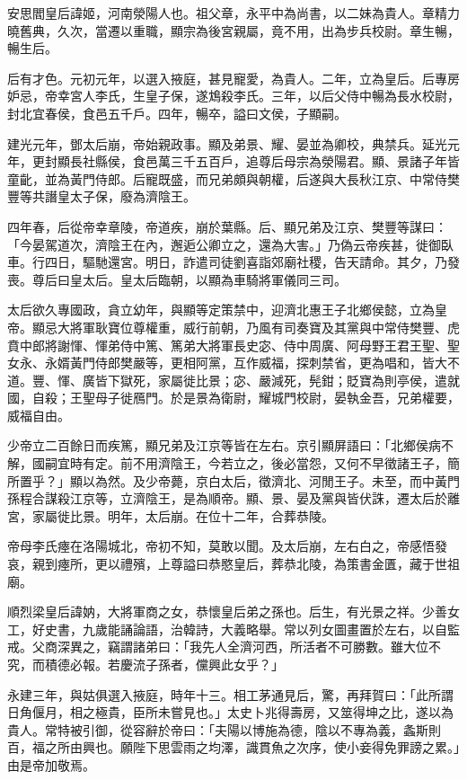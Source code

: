 
\begin{pinyinscope}
安思閻皇后諱姬，河南滎陽人也。祖父章，永平中為尚書，以二妹為貴人。章精力曉舊典，久次，當遷以重職，顯宗為後宮親屬，竟不用，出為步兵校尉。章生暢，暢生后。

后有才色。元初元年，以選入掖庭，甚見寵愛，為貴人。二年，立為皇后。后專房妒忌，帝幸宮人李氏，生皇子保，遂鴆殺李氏。三年，以后父侍中暢為長水校尉，封北宜春侯，食邑五千戶。四年，暢卒，謚曰文侯，子顯嗣。

建光元年，鄧太后崩，帝始親政事。顯及弟景、耀、晏並為卿校，典禁兵。延光元年，更封顯長社縣侯，食邑萬三千五百戶，追尊后母宗為滎陽君。顯、景諸子年皆童齔，並為黃門侍郎。后寵既盛，而兄弟頗與朝權，后遂與大長秋江京、中常侍樊豐等共譖皇太子保，廢為濟陰王。

四年春，后從帝幸章陵，帝道疾，崩於葉縣。后、顯兄弟及江京、樊豐等謀曰：「今晏駕道次，濟陰王在內，邂逅公卿立之，還為大害。」乃偽云帝疾甚，徙御臥車。行四日，驅馳還宮。明日，詐遣司徒劉喜詣郊廟社稷，告天請命。其夕，乃發喪。尊后曰皇太后。皇太后臨朝，以顯為車騎將軍儀同三司。

太后欲久專國政，貪立幼年，與顯等定策禁中，迎濟北惠王子北鄉侯懿，立為皇帝。顯忌大將軍耿寶位尊權重，威行前朝，乃風有司奏寶及其黨與中常侍樊豐、虎賁中郎將謝惲、惲弟侍中篤、篤弟大將軍長史宓、侍中周廣、阿母野王君王聖、聖女永、永婿黃門侍郎樊嚴等，更相阿黨，互作威福，探刺禁省，更為唱和，皆大不道。豐、惲、廣皆下獄死，家屬徙比景；宓、嚴減死，髡鉗；貶寶為則亭侯，遣就國，自殺；王聖母子徙鴈門。於是景為衛尉，耀城門校尉，晏執金吾，兄弟權要，威福自由。

少帝立二百餘日而疾篤，顯兄弟及江京等皆在左右。京引顯屏語曰：「北鄉侯病不解，國嗣宜時有定。前不用濟陰王，今若立之，後必當怨，又何不早徵諸王子，簡所置乎？」顯以為然。及少帝薨，京白太后，徵濟北、河閒王子。未至，而中黃門孫程合謀殺江京等，立濟陰王，是為順帝。顯、景、晏及黨與皆伏誅，遷太后於離宮，家屬徙比景。明年，太后崩。在位十二年，合葬恭陵。

帝母李氏瘞在洛陽城北，帝初不知，莫敢以聞。及太后崩，左右白之，帝感悟發哀，親到瘞所，更以禮殯，上尊謚曰恭愍皇后，葬恭北陵，為策書金匱，藏于世祖廟。

順烈梁皇后諱妠，大將軍商之女，恭懷皇后弟之孫也。后生，有光景之祥。少善女工，好史書，九歲能誦論語，治韓詩，大義略舉。常以列女圖畫置於左右，以自監戒。父商深異之，竊謂諸弟曰：「我先人全濟河西，所活者不可勝數。雖大位不究，而積德必報。若慶流子孫者，儻興此女乎？」

永建三年，與姑俱選入掖庭，時年十三。相工茅通見后，驚，再拜賀曰：「此所謂日角偃月，相之極貴，臣所未嘗見也。」太史卜兆得壽房，又筮得坤之比，遂以為貴人。常特被引御，從容辭於帝曰：「夫陽以博施為德，陰以不專為義，螽斯則百，福之所由興也。願陛下思雲雨之均澤，識貫魚之次序，使小妾得免罪謗之累。」由是帝加敬焉。


\end{pinyinscope}
